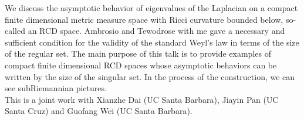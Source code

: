 \mypage
{}
\begin{myabstract}
We discuss the asymptotic behavior of eigenvalues of the Laplacian on a compact finite dimensional metric measure space with Ricci curvature bounded below, so-called an RCD space. Ambrosio and Tewodrose with me gave a necessary and sufficient condition for the validity of the standard Weyl's law in terms of the size of the regular set. The main purpose of this talk is to provide examples of compact finite dimensional RCD spaces whose asymptotic behaviors can be written by the size of the singular set. In the process of the construction, we can see subRiemannian pictures. \\\relax
This is a joint work with Xianzhe Dai (UC Santa Barbara), Jiayin Pan (UC Santa Cruz) and Guofang Wei (UC Santa Barbara).
\end{myabstract}
